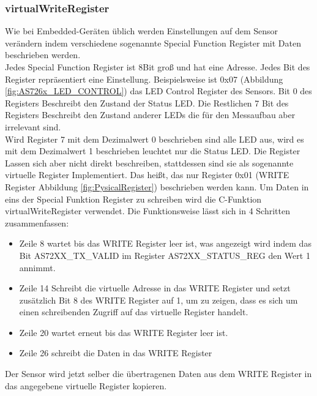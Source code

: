 \subsubsection{virtualWriteRegister}
Wie bei Embedded-Geräten üblich werden Einstellungen auf dem Sensor verändern indem verschiedene sogenannte Special Function Register mit Daten beschrieben werden.\\
Jedes Special Function Register ist 8Bit groß und hat eine Adresse. Jedes Bit des Register repräsentiert eine Einstellung.
Beispielsweise ist 0x07 (Abbildung \ref{fig:AS726x_LED_CONTROL}) das LED Control Register des Sensors.
Bit 0 des Registers Beschreibt den Zustand der Status LED.
Die Restlichen 7 Bit des Registers Beschreibt den Zustand anderer LEDs die für den Messaufbau aber irrelevant sind.\\
Wird Register 7 mit dem Dezimalwert 0 beschrieben sind alle LED aus, wird es mit dem Dezimalwert 1 beschrieben leuchtet nur die Status LED.
Die Register Lassen sich aber nicht direkt beschreiben, stattdessen sind sie als sogenannte virtuelle Register Implementiert.
Das heißt, das nur Register 0x01 (WRITE Register Abbildung \ref{fig:PysicalRegister}) beschrieben werden kann.
Um Daten in eins der Special Funktion Register zu schreiben wird die C-Funktion virtualWriteRegister verwendet.
Die Funktionsweise lässt sich in 4 Schritten zusammenfassen:
\begin{itemize}
	\item Zeile 8 wartet bis das WRITE Register leer ist, was angezeigt wird indem  das Bit AS72XX\_TX\_VALID im  Register AS72XX\_STATUS\_REG den Wert 1 annimmt.
	\item Zeile 14 Schreibt die virtuelle Adresse in das WRITE Register und setzt zusätzlich Bit 8 des WRITE Register auf 1, um zu zeigen, dass es sich um einen schreibenden Zugriff auf das virtuelle Register handelt.
	\item Zeile 20 wartet erneut bis das WRITE Register leer ist.
	\item Zeile 26 schreibt die Daten in das WRITE Register
\end{itemize}
Der Sensor wird jetzt selber die übertragenen Daten aus dem WRITE Register in das angegebene virtuelle Register kopieren.


